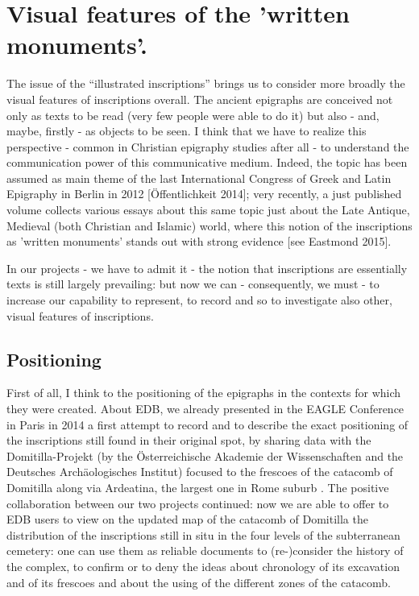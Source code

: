 \documentclass[amsthm,ebook]{saparticle}
\begin{document}
\section{Visual features of the 'written monuments'.}


The issue of the ``illustrated inscriptions'' brings us to consider more broadly the visual
features of inscriptions overall. The ancient epigraphs are conceived not only as texts to be read (very few people
were able to do it) but also - and, maybe, firstly - as objects to be seen. I think that we have to realize this
perspective - common in Christian epigraphy studies after all - to understand the communication power of this
communicative medium. Indeed, the topic has been assumed as main theme of the last International Congress of Greek and
Latin Epigraphy in Berlin in 2012 [Öffentlichkeit 2014]; very recently, a just published volume collects various essays
about this same topic just about the Late Antique, Medieval (both Christian and Islamic) world, where this notion of
the inscriptions as 'written monuments' stands out with strong evidence [see Eastmond 2015]. 

In our projects - we have to admit it - the notion that inscriptions are essentially texts is still largely
prevailing: but now we can - consequently, we must - to increase our capability to represent, to record and so to
investigate also other, visual features of inscriptions. 




\subsection{Positioning}


First of all, I think to the positioning of the epigraphs in the contexts for which they were created. About EDB, we
already presented in the EAGLE Conference in Paris in 2014 a first attempt to record and to describe the exact
positioning of the inscriptions still found in their original spot, by sharing data with the Domitilla-Projekt (by the
Österreichische Akademie der Wissenschaften and the Deutsches Archäologisches Institut) focused to the frescoes of the
catacomb of Domitilla along via Ardeatina, the largest one in Rome suburb \citet{zimmermann_epigraphy_2014}. The positive
collaboration between our two projects continued: now we are able to offer to EDB users to view on the updated map of
the catacomb of Domitilla the distribution of the inscriptions still in situ in the four levels of the subterranean
cemetery: one can use them as reliable documents to (re-)consider the history of the complex, to confirm or to deny the
ideas about chronology of its excavation and of its frescoes and about the using of the different zones of the
catacomb.
\end{document}
